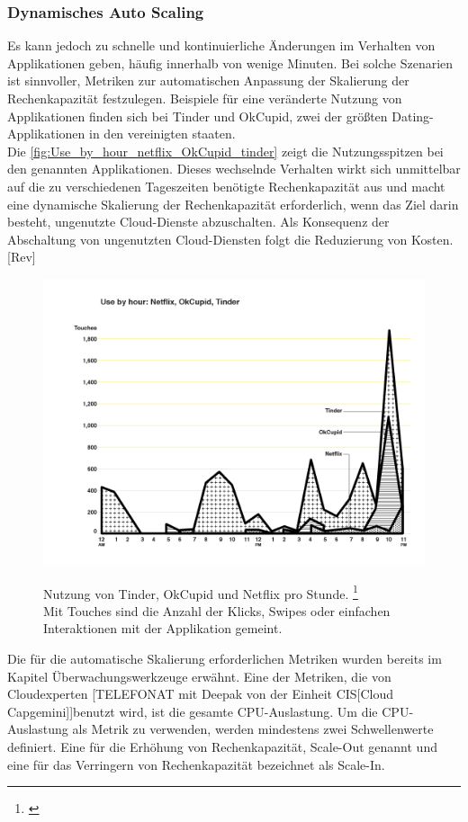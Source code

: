 \subsubsection{Dynamisches Auto Scaling}
Es kann jedoch zu schnelle und kontinuierliche Änderungen im Verhalten von Applikationen geben, häufig innerhalb von wenige Minuten. Bei solche Szenarien ist sinnvoller, Metriken zur automatischen Anpassung der Skalierung der Rechenkapazität festzulegen. Beispiele für eine veränderte Nutzung von Applikationen finden sich bei Tinder und OkCupid, zwei der größten Dating-Applikationen in den vereinigten staaten. \\
Die \autoref{fig:Use_by_hour_netflix_OkCupid_tinder} zeigt die Nutzungsspitzen bei den genannten Applikationen. Dieses wechselnde Verhalten wirkt sich unmittelbar auf die zu verschiedenen Tageszeiten benötigte Rechenkapazität aus und macht eine dynamische Skalierung der Rechenkapazität erforderlich, wenn das Ziel darin besteht, ungenutzte Cloud-Dienste abzuschalten. Als Konsequenz der Abschaltung von ungenutzten Cloud-Diensten folgt die Reduzierung von Kosten.[Rev]
\begin{figure}[h!]
  \centering
  \includegraphics[scale=0.4]{sources/Use_by_hour_netflix_OkCupid_tinder}
  \caption[Nutzung von Tinder, OkCupid und Netflix pro Stunde]{}\label{fig:Use_by_hour_netflix_OkCupid_tinder} Nutzung von Tinder, OkCupid und Netflix pro Stunde.  
  \footnote{\cite{SCOUT1}}
  \\Mit Touches sind die Anzahl der Klicks, Swipes oder einfachen Interaktionen mit der Applikation gemeint.
\end{figure}
Die für die automatische Skalierung erforderlichen Metriken wurden bereits im Kapitel Überwachungswerkzeuge erwähnt. Eine der Metriken, die von Cloudexperten [TELEFONAT mit Deepak von der Einheit CIS[Cloud Capgemini]]benutzt wird, ist die gesamte CPU-Auslastung. 
Um die CPU-Auslastung als Metrik zu verwenden, werden mindestens zwei Schwellenwerte definiert. Eine für die Erhöhung von Rechenkapazität, Scale-Out genannt und eine für das Verringern von Rechenkapazität bezeichnet als Scale-In.

